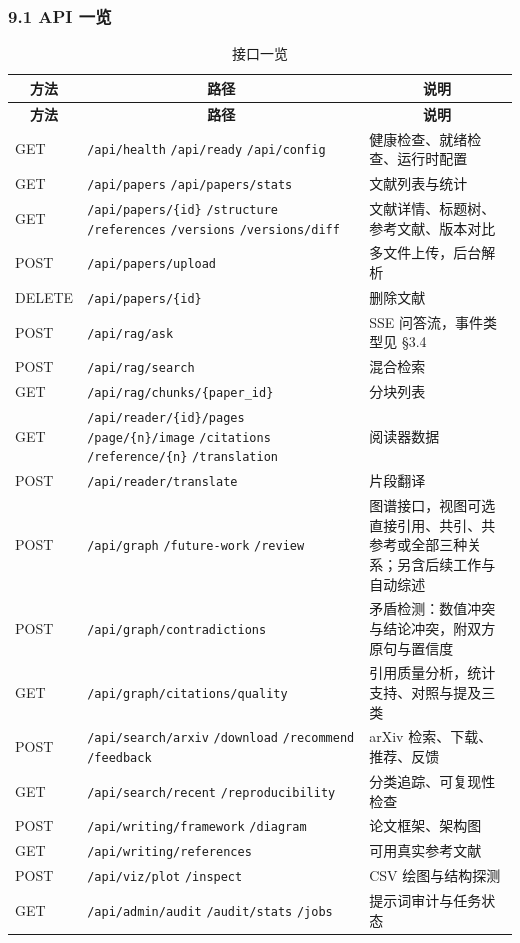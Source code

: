 \documentclass[UTF8,fontset=windows,zihao=5,a4paper]{ctexart}
\begin{document}
\subsubsection*{9.1 API 一览}
\begin{longtable}{@{}p{}p{}p{}@{}}
\caption{接口一览}\\
\toprule
\multicolumn{1}{c}{\textbf{方法}} & \multicolumn{1}{c}{\textbf{路径}} & \multicolumn{1}{c}{\textbf{说明}} \\
\midrule
\endfirsthead
\toprule
\multicolumn{1}{c}{\textbf{方法}} & \multicolumn{1}{c}{\textbf{路径}} & \multicolumn{1}{c}{\textbf{说明}} \\
\midrule
\endhead
\bottomrule
\endfoot
GET & \texttt{/api/health} \texttt{/api/ready} \texttt{/api/config} & 健康检查、就绪检查、运行时配置 \\
GET & \texttt{/api/papers} \texttt{/api/papers/stats} & 文献列表与统计 \\
GET & \texttt{/api/papers/\{id\}} \texttt{/structure} \texttt{/references} \texttt{/versions} \texttt{/versions/diff} & 文献详情、标题树、参考文献、版本对比 \\
POST & \texttt{/api/papers/upload} & 多文件上传，后台解析 \\
DELETE & \texttt{/api/papers/\{id\}} & 删除文献 \\
POST & \texttt{/api/rag/ask} & SSE 问答流，事件类型见 §3.4 \\
POST & \texttt{/api/rag/search} & 混合检索 \\
GET & \texttt{/api/rag/chunks/\{paper\_\allowbreak{}id\}} & 分块列表 \\
GET & \texttt{/api/reader/\{id\}/pages} \texttt{/page/\{n\}/image} \texttt{/citations} \texttt{/reference/\{n\}} \texttt{/translation} & 阅读器数据 \\
POST & \texttt{/api/reader/translate} & 片段翻译 \\
POST & \texttt{/api/graph} \texttt{/future-work} \texttt{/review} & 图谱接口，视图可选直接引用、共引、共参考或全部三种关系；另含后续工作与自动综述 \\
POST & \texttt{/api/graph/contradictions} & 矛盾检测：数值冲突与结论冲突，附双方原句与置信度 \\
GET & \texttt{/api/graph/citations/quality} & 引用质量分析，统计支持、对照与提及三类 \\
POST & \texttt{/api/search/arxiv} \texttt{/download} \texttt{/recommend} \texttt{/feedback} & arXiv 检索、下载、推荐、反馈 \\
GET & \texttt{/api/search/recent} \texttt{/reproducibility} & 分类追踪、可复现性检查 \\
POST & \texttt{/api/writing/framework} \texttt{/diagram} & 论文框架、架构图 \\
GET & \texttt{/api/writing/references} & 可用真实参考文献 \\
POST & \texttt{/api/viz/plot} \texttt{/inspect} & CSV 绘图与结构探测 \\
GET & \texttt{/api/admin/audit} \texttt{/audit/stats} \texttt{/jobs} & 提示词审计与任务状态 \\
\end{longtable}
\end{document}
